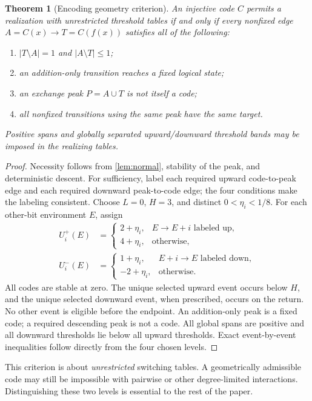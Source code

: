 \documentclass[12pt,letterpaper]{article}
\newtheorem{theorem}{Theorem}[section]
\theoremstyle{definition}\newtheorem{definition}[theorem]{Definition}
\theoremstyle{remark}\newtheorem{remark}[theorem]{Remark}
\begin{document}
\begin{theorem}[Encoding geometry criterion]\label{thm:criterion}
An injective code $C$ permits a realization with unrestricted threshold tables if and only if every nonfixed edge $A=C(x)\to T=C(f(x))$ satisfies all of the following:
\begin{enumerate}[label=(\roman*),nosep]
\item $|T\setminus A|=1$ and $|A\setminus T|\le1$;
\item an addition-only transition reaches a fixed logical state;
\item an exchange peak $P=A\cup T$ is not itself a code;
\item all nonfixed transitions using the same peak have the same target.
\end{enumerate}
Positive spans and globally separated upward/downward threshold bands may be imposed in the realizing tables.
\end{theorem}
\begin{proof}
Necessity follows from \cref{lem:normal}, stability of the peak, and deterministic descent. For sufficiency, label each required upward code-to-peak edge and each required downward peak-to-code edge; the four conditions make the labeling consistent. Choose $L=0$, $H=3$, and distinct $0<\eta_i<1/8$. For each other-bit environment $E$, assign
\begin{align}\label{eq:tableconstruction}
U_i^+(E)&=\begin{cases}2+\eta_i,&E\to E+i\text{ labeled up},\\4+\eta_i,&\text{otherwise},\end{cases}\\
U_i^-(E)&=\begin{cases}1+\eta_i,&E+i\to E\text{ labeled down},\\-2+\eta_i,&\text{otherwise}.\end{cases}\nonumber
\end{align}
All codes are stable at zero. The unique selected upward event occurs below $H$, and the unique selected downward event, when prescribed, occurs on the return. No other event is eligible before the endpoint. An addition-only peak is a fixed code; a required descending peak is not a code. All global spans are positive and all downward thresholds lie below all upward thresholds. Exact event-by-event inequalities follow directly from the four chosen levels.
\end{proof}

This criterion is about \emph{unrestricted} switching tables. A geometrically admissible code may still be impossible with pairwise or other degree-limited interactions. Distinguishing these two levels is essential to the rest of the paper.
\end{document}
